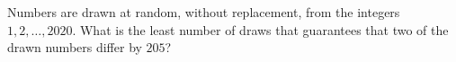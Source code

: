 Numbers are drawn at random, without replacement, from the integers $1,2,\dots,2020$. What is the least number of draws that guarantees that two of the drawn numbers differ by $205$?
